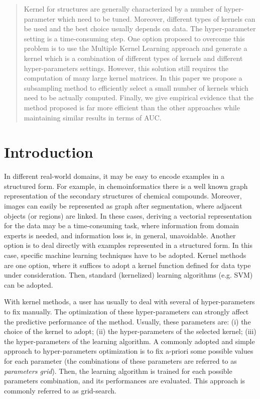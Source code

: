 \documentclass{esannV2}
\newcommand{\1}{{\bf 1}}
\begin{document}
\begin{abstract}
Kernel for structures are generally characterized by a number of hyper-parameter which need to be tuned. Moreover, different types of kernels can be used and the best choice usually depends on data. The hyper-parameter setting is a time-consuming step. One option proposed to overcome this problem is to use the Multiple Kernel Learning approach and generate a kernel which is a combination of different types of kernels and different hyper-parameters settings. However, this solution still requires the computation of many large kernel matrices. In this paper we propose a subsampling method to efficiently select a small number of kernels which need to be actually computed. Finally, we give empirical evidence that the method proposed is far more efficient than the other approaches while maintaining similar results in terms of AUC.
\end{abstract}


\section{Introduction}
In different real-world domains, it may be easy to encode examples in a structured form. For example, in chemoinformatics there is a well known graph representation of the secondary structures of chemical compounds. Moreover, images can easily be represented as graph after segmentation, where adjacent objects (or regions) are linked.
In these cases, deriving a vectorial representation for the data may be a time-consuming task, where information from  domain experts is needed, and information loss is, in general, unavoidable.
Another option is to deal directly with examples represented in a structured form.
In this case, specific machine learning techniques have to be adopted.
Kernel methods are one option, where it suffices to adopt a kernel function defined for data type under consideration. Then, standard (kernelized) learning algorithms (e.g. SVM) can be adopted.

With kernel methods, a user has usually to deal with several of hyper-parameters to fix manually. The optimization of these hyper-parameters can strongly affect the predictive performance of the method.
Usually, these parameters are: (i) the choice of the kernel to adopt; (ii) the hyper-parameters of the selected kernel; (iii) the hyper-parameters of the learning algorithm.
A commonly adopted and simple approach to hyper-parameters optimization is to fix a-priori some possible values for each parameter (the combinations of these parameters are referred to as \textit{parameters grid}).
Then, the learning algorithm is trained for each possible parameters combination, and its performances are evaluated. This approach is commonly referred to as grid-search.
\end{document}
